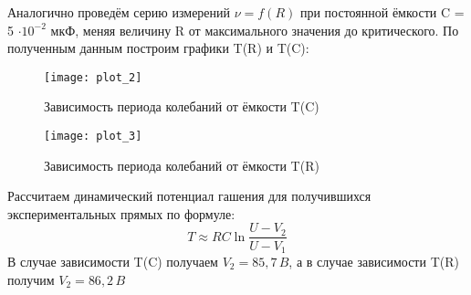 Аналогично проведём серию измерений $\nu = f(R)$ при постоянной ёмкости C = 5 $\cdot 10^{-2}$  мкФ,  меняя величину R от максимального значения до критического.
\newpage
По полученным данным построим графики T(R) и T(C):
\begin{figure}[h!]
	\centering
	\texttt{[image: plot\_2]}
	\caption{Зависимость периода колебаний от ёмкости T(C)}
	\label{fig:plot_2}
\end{figure}
\begin{figure}[h!]
	\centering
	\texttt{[image: plot\_3]}
	\caption{Зависимость периода колебаний от ёмкости T(R)}
	\label{fig:plot_3}
\end{figure}


Рассчитаем динамический потенциал гашения для получившихся экспериментальных прямых по формуле: \\
\[
T \approx RC \ln \frac{U - V_2}{U - V_1}
\]
В случае зависимости T(C) получаем $V_2 = 85,7 \, B$, а в случае зависимости T(R) получим $V_2 = 86,2 \, B$

